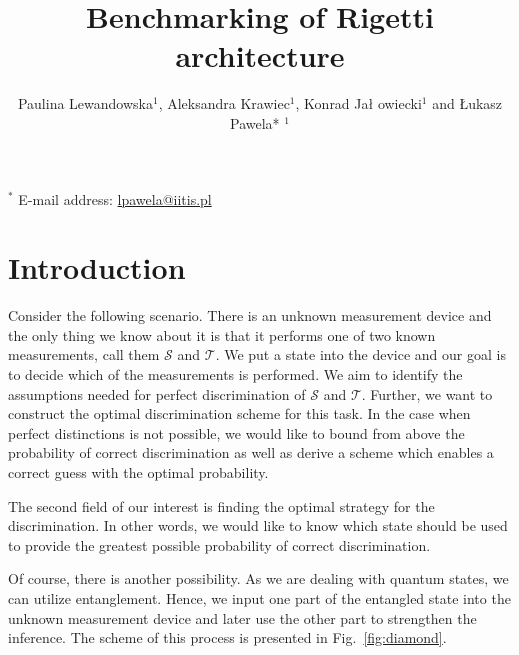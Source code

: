 \documentclass[11pt,a4paper,reqno, oneside]{amsart}
\title{Benchmarking of Rigetti architecture}
\author{Paulina Lewandowska$^{1}$, Aleksandra Krawiec$^{1}$, Konrad Ja\l 
owiecki$^1$ and \L ukasz Pawela* $^{1}$}
\newcommand{\1}{{\rm 1\hspace{-0.9mm}l}}
\newcommand{\TT}{\mathcal{T}}
\begin{document}
\maketitle
$^{*}$ \normalsize{E-mail address: \url{lpawela@iitis.pl}}
\begin{abstract}

\end{abstract}

\section{Introduction}




Consider the following scenario. There is an unknown measurement device and the
only thing we know about it is that it performs one of two known measurements,
call them $\mathcal{S}$ and $\mathcal{T}$. We put a state into the device and
our goal is to decide which of the measurements is performed. We aim to identify
the assumptions needed for perfect discrimination of $\mathcal{S}$ and $\TT$.
Further, we want to construct the optimal discrimination scheme for this task. 
In
the case when perfect distinctions is not possible, we would like to bound
from above the probability of correct discrimination as well as derive a scheme
which enables a correct guess with the optimal probability.

The second field of our interest is finding the optimal strategy for the
discrimination. In other words, we would like to know which state should be used
to provide the greatest possible probability of correct discrimination.



Of course, there is another possibility. As we are dealing with quantum states,
we can utilize entanglement. Hence, we input one part of the entangled state
into the unknown measurement device and later use the other part to strengthen
the inference. The scheme of this process is presented in
Fig.~\ref{fig:diamond}.
\end{document}
